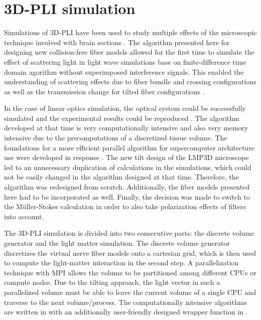 \cleardoublepage
\setcounter{chapter}{5}
\chapter{\acs{3D-PLI} simulation}
\label{cha:sof:simulation}
%
Simulations of \ac{3D-PLI} have been used to study multiple effects of the microscopic technique involved with brain sections \cite{Dohmen2015,Menzel2015,Menzel2016,Menzel2020,Menzel2021,MenzelMaster,MenzelDissertation}.
The algorithm presented here for designing new collision-free fiber models allowed for the first time to simulate the effect of scattering light in light wave simulations base on finite-difference time domain agorithm without superimposed interference signals.
This enabled the understanding of scattering effects due to fiber bundle and crossing configurations as well as the transmission change for tilted fiber configurations \cite{MenzelDissertation,Menzel2020,Menzel2021}.
\par
% 
In the case of linear optics simulation, the optical system could be successfully simulated and the experimental results could be reproduced \cite{Dohmen2015,Menzel2016}.
The algorithm developed at that time is very computationally intensive and also very memory intensive due to the precomputations of a discretized tissue volume.
The foundations for a more efficient parallel algorithm for supercomputer architecture use were developed in response \cite{Lucksch2016}.
The new tilt design of the LMP3D microscope led to an unnecessary duplication of calculations in the simulations, which could not be easily changed in the algorithm designed at that time.
Therefore, the algorithm was redesigned from scratch.
Additionally, the fiber models presented here had to be incorporated as well.
Finally, the decision was made to switch to the M\"{u}ller-Stokes calculation in order to also take polarization effects of filters into account.
\par
%
The \ac{3D-PLI} simulation is divided into two consecutive parts: the discrete volume generator and the light matter simulation.
The discrete volume generator discretizes the virtual nerve fiber models onto a cartesian grid, which is then used to compute the light-matter interaction in the second step.
A parallelization technique with \ac{MPI} allows the volume to be partitioned among different \acp{CPU} or compute nodes.
Due to the tilting approach, the light vector in such a parallelized volume must be able to leave the current volume of a single \ac{CPU} and traverse to the next volume/process.
The computationally intensive algorithms are written in \cpp{} with an additionally user-friendly designed wrapper function in \python{}.
%
% 
% 
